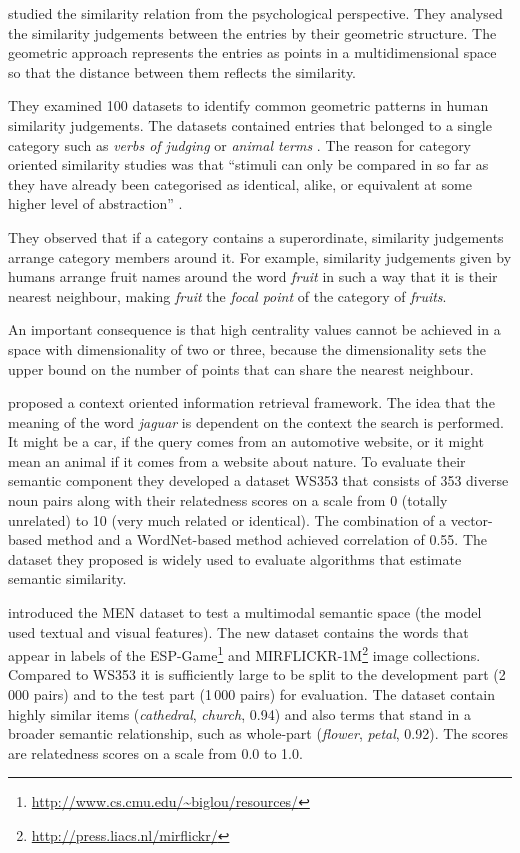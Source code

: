  studied the similarity relation from the psychological perspective. They analysed the similarity judgements between the entries by their geometric structure. The geometric approach represents the entries as points in a multidimensional space so that the distance between them reflects the similarity.

They examined 100 datasets to identify common geometric patterns in human similarity judgements. The datasets contained entries that belonged to a single category such as \textit{verbs of judging} \cite{FILLENBAUM197454} or \textit{animal terms} \cite{HENLEY1969176}. The reason for category oriented similarity studies was that ``stimuli can only be compared in so far as they have already been categorised as identical, alike, or equivalent at some higher level of abstraction'' \cite{turner1987rediscovering}.

They observed that if a category contains a superordinate, similarity judgements arrange category members around it. For example, similarity judgements given by humans arrange fruit names around the word \textit{fruit} in such a way that it is their nearest neighbour, making \textit{fruit} the \emph{focal point} of the category of \textit{fruits}.

An important consequence is that high centrality values cannot be achieved in a space with dimensionality of two or three,  because the dimensionality sets the upper bound on the number of points that can share the nearest neighbour.



 proposed a context oriented information retrieval framework. The idea that the meaning of the word \textit{jaguar} is dependent on the context the search is performed. It might be a car, if the query comes from an automotive website, or it might mean an animal if it comes from a website about nature. To evaluate their semantic component they developed a dataset WS353 that consists of 353 diverse noun pairs along with their relatedness scores on a scale from 0 (totally unrelated) to 10 (very much related or identical). The combination of a vector-based method and a WordNet-based method achieved correlation of 0.55. The dataset they proposed is widely used to evaluate algorithms that estimate semantic similarity.

 introduced the MEN dataset to test a multimodal semantic space (the model used textual and visual features). The new dataset contains the words that appear in labels of the ESP-Game\footnote{\url{http://www.cs.cmu.edu/~biglou/resources/}} and MIRFLICKR-1M\footnote{\url{http://press.liacs.nl/mirflickr/}} image collections. Compared to WS353 it is sufficiently large to be split to the development part (2\,000 pairs) and to the test part (1\,000 pairs) for evaluation. The dataset contain highly similar items (\textit{cathedral}, \textit{church}, 0.94) and also terms that stand in a broader semantic relationship, such as whole-part (\textit{flower}, \textit{petal}, 0.92). The scores are relatedness scores on a scale from 0.0 to 1.0.

